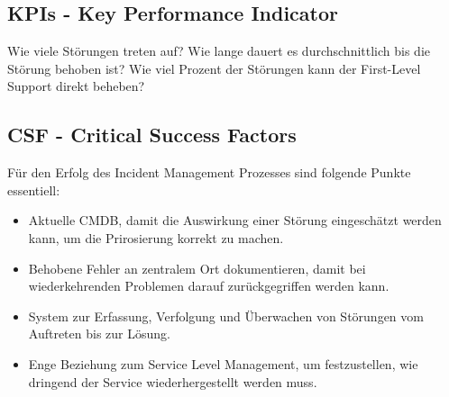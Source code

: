 \subsection{KPIs - Key Performance Indicator}
Wie viele Störungen treten auf? Wie lange dauert es durchschnittlich bis die Störung behoben ist? Wie viel Prozent der Störungen kann der First-Level Support direkt beheben?
\subsection{CSF - Critical Success Factors}
Für den Erfolg des Incident Management Prozesses sind folgende Punkte essentiell:
\begin{itemize}
	\item Aktuelle CMDB, damit die Auswirkung einer Störung eingeschätzt werden kann, um die Prirosierung korrekt zu machen.
	\item Behobene Fehler an zentralem Ort dokumentieren, damit bei wiederkehrenden Problemen darauf zurückgegriffen werden kann.
	\item System zur Erfassung, Verfolgung und Überwachen von Störungen vom Auftreten bis zur Lösung.
	\item Enge Beziehung zum Service Level Management, um festzustellen, wie dringend der Service wiederhergestellt werden muss.
\end{itemize}
